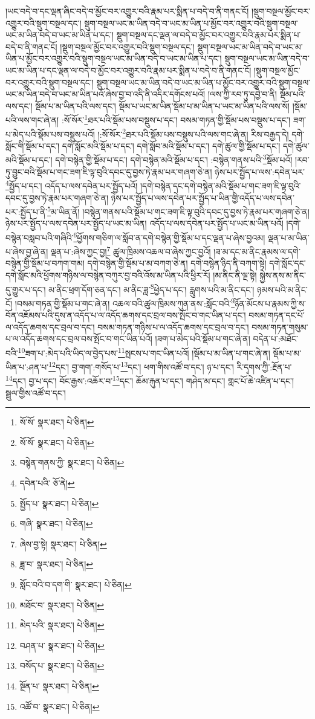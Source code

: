 །ཡང་བདེ་བ་དང་ལྡན་ཞིང་བདེ་བ་མྱོང་བར་འགྱུར་བའི་རྣམ་པར་སྨིན་པ་བདེ་བ་ནི་གནང་ངོ། །སྡུག་བསྔལ་མྱོང་བར་འགྱུར་བའི་སྡུག་བསྔལ་དང་། སྡུག་བསྔལ་ཡང་མ་ཡིན་བདེ་བ་ཡང་མ་ཡིན་པ་མྱོང་བར་འགྱུར་བའི་སྡུག་བསྔལ་ཡང་མ་ཡིན་བདེ་བ་ཡང་མ་ཡིན་པ་དང་། སྡུག་བསྔལ་དང་ལྡན་ལ་བདེ་བ་མྱོང་བར་འགྱུར་བའི་རྣམ་པར་སྨིན་པ་བདེ་བ་ནི་གནང་ངོ། །སྡུག་བསྔལ་མྱོང་བར་འགྱུར་བའི་སྡུག་བསྔལ་དང་། སྡུག་བསྔལ་ཡང་མ་ཡིན་བདེ་བ་ཡང་མ་ཡིན་པ་མྱོང་བར་འགྱུར་བའི་སྡུག་བསྔལ་ཡང་མ་ཡིན་བདེ་བ་ཡང་མ་ཡིན་པ་དང་། སྡུག་བསྔལ་ཡང་མ་ཡིན་བདེ་བ་ཡང་མ་ཡིན་པ་དང་ལྡན་ལ་བདེ་བ་མྱོང་བར་འགྱུར་བའི་རྣམ་པར་སྨིན་པ་བདེ་བ་ནི་གནང་ངོ། །སྡུག་བསྔལ་མྱོང་བར་འགྱུར་བའི་སྡུག་བསྔལ་དང་། སྡུག་བསྔལ་ཡང་མ་ཡིན་བདེ་བ་ཡང་མ་ཡིན་པ་མྱོང་བར་འགྱུར་བའི་སྡུག་བསྔལ་ཡང་མ་ཡིན་བདེ་བ་ཡང་མ་ཡིན་པའོ་ཞེས་བྱ་བ་འདི་ནི་འདིར་དགོངས་པའོ། །ལས་ཀྱི་རབ་ཏུ་དབྱེ་བ་ནི། སྡོམ་པའི་ལས་དང་། སྡོམ་པ་མ་ཡིན་པའི་ལས་དང་། སྡོམ་པ་ཡང་མ་ཡིན་སྡོམ་པ་མ་ཡིན་པ་ཡང་མ་ཡིན་པའི་ལས་སོ། །སྡོམ་པའི་ལས་གང་ཞེ་ན། :སོ་སོར་\footnote{སོ་སོ་  སྣར་ཐང་།  པེ་ཅིན། }ཐར་པའི་སྡོམ་པས་བསྡུས་པ་དང་། བསམ་གཏན་གྱི་སྡོམ་པས་བསྡུས་པ་དང་། ཟག་པ་མེད་པའི་སྡོམ་པས་བསྡུས་པའོ། །:སོ་སོར་\footnote{སོ་སོ་  སྣར་ཐང་།  པེ་ཅིན། }ཐར་པའི་སྡོམ་པས་བསྡུས་པའི་ལས་གང་ཞེ་ན། རིས་བརྒྱད་དེ། དགེ་སློང་གི་སྡོམ་པ་དང་། དགེ་སློང་མའི་སྡོམ་པ་དང་། དགེ་སློབ་མའི་སྡོམ་པ་དང་། དགེ་ཚུལ་གྱི་སྡོམ་པ་དང་། དགེ་ཚུལ་མའི་སྡོམ་པ་དང་། དགེ་བསྙེན་གྱི་སྡོམ་པ་དང་། དགེ་བསྙེན་མའི་སྡོམ་པ་དང་། :བསྙེན་གནས་པའི་\footnote{བསྙེན་གནས་ཀྱི་  སྣར་ཐང་།  པེ་ཅིན། }སྡོམ་པའོ། །རབ་ཏུ་བྱུང་བའི་སྡོམ་པ་གང་ཟག་ཇི་ལྟ་བུའི་དབང་དུ་བྱས་ཏེ་རྣམ་པར་གཞག་ཅེ་ན། ཉེས་པར་སྤྱོད་པ་ལས་:དབེན་པར་\footnote{དབེན་པའི་  ཅོ་ནེ། }སྤྱོད་པ་དང་། འདོད་པ་ལས་དབེན་པར་སྤྱོད་པའོ། །དགེ་བསྙེན་དང་དགེ་བསྙེན་མའི་སྡོམ་པ་གང་ཟག་ཇི་ལྟ་བུའི་དབང་དུ་བྱས་ཏེ་རྣམ་པར་གཞག་ཅེ་ན། ཉེས་པར་སྤྱོད་པ་ལས་དབེན་པར་སྤྱོད་པ་ཡིན་གྱི་འདོད་པ་ལས་དབེན་པར་:སྤྱོད་པ་ནི་\footnote{སྤྱོད་པ་  སྣར་ཐང་།  པེ་ཅིན། }མ་ཡིན་ནོ། །བསྙེན་གནས་པའི་སྡོམ་པ་གང་ཟག་ཇི་ལྟ་བུའི་དབང་དུ་བྱས་ཏེ་རྣམ་པར་གཞག་ཅེ་ན། ཉེས་པར་སྤྱོད་པ་ལས་དབེན་པར་སྤྱོད་པ་ཡང་མ་ཡིན། འདོད་པ་ལས་དབེན་པར་སྤྱོད་པ་ཡང་མ་ཡིན་པའོ། །དགེ་བསྙེན་བསླབ་པའི་གཞིའི་\footnote{གཞི་  སྣར་ཐང་།  པེ་ཅིན། }ཕྱོགས་གཅིག་ལ་སློབ་ན་དགེ་བསྙེན་གྱི་སྡོམ་པ་དང་ལྡན་པ་ཞེས་བྱའམ། ལྡན་པ་མ་ཡིན་པ་ཞེས་བྱ་ཞེ་ན། ལྡན་པ་:ཞེས་ཀྱང་བྱ།\footnote{ཞེས་བྱ་སྟེ།  སྣར་ཐང་།  པེ་ཅིན། } ཚུལ་ཁྲིམས་འཆལ་བ་ཞེས་ཀྱང་བྱའོ། །ཟ་མ་དང་མ་ནིང་རྣམས་ལ་དགེ་བསྙེན་གྱི་སྡོམ་པ་བཀག་གམ། དགེ་བསྙེན་གྱི་སྡོམ་པ་མ་བཀག་ཅེ་ན། དགེ་བསྙེན་ཉིད་ནི་བཀག་སྟེ། དགེ་སློང་དང་དགེ་སློང་མའི་ཕྱོགས་གཉིས་ལ་བསྙེན་བཀུར་བྱ་བའི་འོས་མ་ཡིན་པའི་ཕྱིར་རོ། །མ་ནིང་ནི་ལྔ་སྟེ། སྐྱེས་ནས་མ་ནིང་དུ་གྱུར་པ་དང་། མ་ནིང་ཕྲག་དོག་ཅན་དང་། མ་ནིང་ཟླ་\footnote{ཟླ་བ་  སྣར་ཐང་།  པེ་ཅིན། }ཕྱེད་པ་དང་། རླུགས་པའི་མ་ནིང་དང་། ཉམས་པའི་མ་ནིང་ངོ། །བསམ་གཏན་གྱི་སྡོམ་པ་གང་ཞེ་ན། འཆལ་བའི་ཚུལ་ཁྲིམས་ཀུན་ནས་:སློང་བའི་\footnote{སློང་བའི་བ་དག་གི་  སྣར་ཐང་།  པེ་ཅིན། }ཉོན་མོངས་པ་རྣམས་ཀྱི་ས་བོན་འཇོམས་པའི་དུས་ན་འདོད་པ་ལ་འདོད་ཆགས་དང་བྲལ་བས་སྤོང་བ་གང་ཡིན་པ་དང་། བསམ་གཏན་དང་པོ་ལ་འདོད་ཆགས་དང་བྲལ་བ་དང་། བསམ་གཏན་གཉིས་པ་ལ་འདོད་ཆགས་དང་བྲལ་བ་དང་། བསམ་གཏན་གསུམ་པ་ལ་འདོད་ཆགས་དང་བྲལ་བས་སྤོང་བ་གང་ཡིན་པའོ། །ཟག་པ་མེད་པའི་སྡོམ་པ་གང་ཞེ་ན། བདེན་པ་:མཐོང་བའི་\footnote{མཐོང་བ་  སྣར་ཐང་།  པེ་ཅིན། }ཟག་པ་:མེད་པའི་ཡིད་ལ་བྱེད་པས་\footnote{མེད་པའི་  སྣར་ཐང་།  པེ་ཅིན། }སྤངས་པ་གང་ཡིན་པའོ། །སྡོམ་པ་མ་ཡིན་པ་གང་ཞེ་ན། སྡོམ་པ་མ་ཡིན་པ་:ཤན་པ་\footnote{བཤན་པ་  སྣར་ཐང་།  པེ་ཅིན། }དང་། བྱ་གག་:གསོད་པ་\footnote{བསོད་པ་  སྣར་ཐང་།  པེ་ཅིན། }དང་། ཕག་གིས་འཚོ་བ་དང་། ཉ་པ་དང་། རི་དྭགས་ཀྱི་:རྔོན་པ་\footnote{སྔོན་པ་  སྣར་ཐང་།  པེ་ཅིན། }དང་། བྱ་པ་དང་། བོང་རྒྱས་:འཆོར་བ་\footnote{འཚོ་བ་  སྣར་ཐང་།  པེ་ཅིན། }དང་། ཆོམ་རྐུན་པ་དང་། གཤེད་མ་དང་། གླང་པོ་ཆེ་འཛིན་པ་དང་། སྦྲུལ་གྱིས་འཚོ་བ་དང་། 
